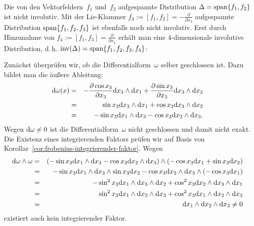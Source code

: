 \begin{loesung}

Die von den Vektorfeldern~$f_{1}$ und~$f_{2}$ aufgespannte Distribution
$\Delta={\operatorname{span}}\{f_{1},f_{2}\}$ ist nicht involutiv. Mit der Lie-Klammer
$f_{3}:=[f_{1},f_{2}]=-\frac{\partial}{\partial x_{3}}$ aufgespannte
Distribution ${\operatorname{span}}\{f_{1},f_{2},f_{3}\}$ ist ebenfalls noch nicht
involutiv. Erst durch Hinzunahme von $f_{4}:=[f_{1},f_{3}]=\frac{\partial}{\partial x_{4}}$
erhält man eine $4$-dimensionale involutive Distribution, d.\,h.
${\operatorname{inv}}(\Delta)={\operatorname{span}}\{f_{1},f_{2},f_{3},f_{4}\}$:

\begin{maxima}\end{maxima}

\end{loesung}

\begin{loesung}Zunächst überprüfen wir, ob die Differentialform~$\omega$
selber geschlossen ist. Dazu bildet man die äußere Ableitung:
\begin{eqnarray*}
{\mathrm{d}}\omega(x) & = & -\frac{\partial\cos x_{3}}{\partial x_{3}}{\mathrm{d}} x_{3}\wedge{\mathrm{d}} x_{1}+\frac{\partial\sin x_{3}}{\partial x_{3}}{\mathrm{d}} x_{3}\wedge{\mathrm{d}} x_{2}\\
 & = & \sin x_{3}{\mathrm{d}} x_{3}\wedge{\mathrm{d}} x_{1}+\cos x_{3}{\mathrm{d}} x_{3}\wedge{\mathrm{d}} x_{2}\\
 & = & -\sin x_{3}{\mathrm{d}} x_{1}\wedge{\mathrm{d}} x_{3}-\cos x_{3}{\mathrm{d}} x_{2}\wedge{\mathrm{d}} x_{3}.
\end{eqnarray*}
Wegen ${\mathrm{d}}\omega\neq0$ ist die Differentialform~$\omega$ nicht geschlossen
und damit nicht exakt. Die Existenz eines integrierenden Faktors prüfen
wir auf Basis von Korollar~\ref{cor:frobenius-integrierender-faktor}.
Wegen 
\begin{eqnarray*}
{\mathrm{d}}\omega\wedge\omega & = & \left(-\sin x_{3}{\mathrm{d}} x_{1}\wedge{\mathrm{d}} x_{3}-\cos x_{3}{\mathrm{d}} x_{2}\wedge{\mathrm{d}} x_{3}\right)\wedge\left(-\cos x_{3}{\mathrm{d}} x_{1}+\sin x_{3}{\mathrm{d}} x_{2}\right)\\
 & = & -\sin x_{3}{\mathrm{d}} x_{1}\wedge{\mathrm{d}} x_{3}\wedge\sin x_{3}{\mathrm{d}} x_{2}-\cos x_{3}{\mathrm{d}} x_{2}\wedge{\mathrm{d}} x_{3}\wedge(-\cos x_{3}{\mathrm{d}} x_{1})\\
 & = & -\sin^{2}x_{3}{\mathrm{d}} x_{1}\wedge{\mathrm{d}} x_{3}\wedge{\mathrm{d}} x_{2}+\cos^{2}x_{3}{\mathrm{d}} x_{2}\wedge{\mathrm{d}} x_{3}\wedge{\mathrm{d}} x_{1}\\
 & = & \sin^{2}x_{3}{\mathrm{d}} x_{1}\wedge{\mathrm{d}} x_{2}\wedge{\mathrm{d}} x_{3}+\cos^{2}x_{3}{\mathrm{d}} x_{1}\wedge{\mathrm{d}} x_{2}\wedge{\mathrm{d}} x_{3}\\
 & = & {\mathrm{d}} x_{1}\wedge{\mathrm{d}} x_{2}\wedge{\mathrm{d}} x_{3}\neq0
\end{eqnarray*}
existiert auch kein integrierender Faktor.

\end{loesung}




